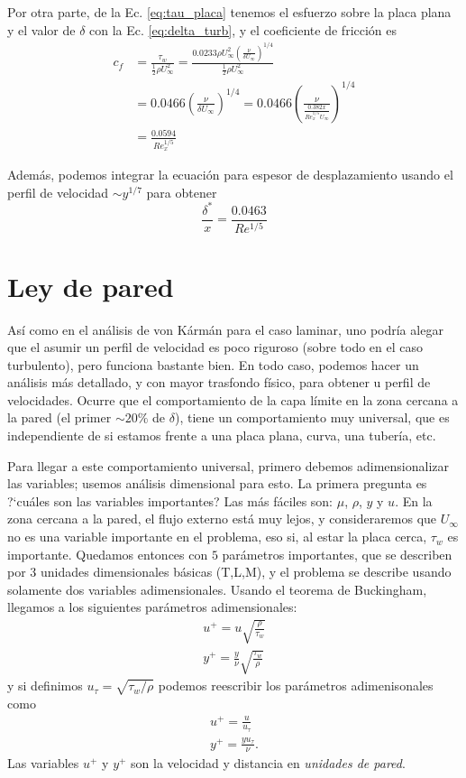 Por otra parte, de la Ec. \eqref{eq:tau_placa} tenemos el esfuerzo sobre la placa plana y el valor de $\delta$ con la Ec. \eqref{eq:delta_turb}, y el coeficiente de fricción es
%
\begin{align}
c_f &= \frac{\tau_w}{\frac{1}{2}\rho U_\infty^2} = \frac{0.0233\rho U_\infty^2\left(\frac{\nu}{\delta U_\infty}\right)^{1/4}}{\frac{1}{2}\rho U_\infty^2 }\nonumber\\
    &= 0.0466\left(\frac{\nu}{\delta U_\infty}\right)^{1/4} = 0.0466\left(\frac{\nu}{\frac{0.382x}{Re_x^{1/5} U_\infty}}\right)^{1/4} \nonumber\\
    &= \frac{0.0594}{Re_x^{1/5}}
\end{align}

Además, podemos integrar la ecuación para espesor de desplazamiento usando el perfil de velocidad $\sim y^{1/7}$ para obtener
%
\begin{equation}
\frac{\delta^*}{x}=\frac{0.0463}{Re^{1/5}} 
\end{equation}

\section*{Ley de pared}

Así como en el análisis de von Kármán para el caso laminar, uno podría alegar que el asumir un perfil de velocidad es poco riguroso (sobre todo en el caso turbulento), pero funciona bastante bien.
En todo caso, podemos hacer un análisis más detallado, y con mayor trasfondo físico, para obtener u perfil de velocidades.
Ocurre que el comportamiento de la capa límite en la zona cercana a la pared (el primer $\sim20\%$ de $\delta$), tiene un comportamiento muy universal, que es independiente de si estamos frente a una placa plana, curva, una tubería, etc.

Para llegar a este comportamiento universal, primero debemos adimensionalizar las variables; usemos análisis dimensional para esto.
La primera pregunta es \mbox{?`}cuáles son las variables importantes? Las más fáciles son: $\mu$, $\rho$, $y$ y $u$.
En la zona cercana a la pared, el flujo externo está muy lejos, y consideraremos que $U_\infty$ no es una variable importante en el problema, eso si, al estar la placa cerca, $\tau_w$ es importante.
Quedamos entonces con $5$ parámetros importantes, que se describen por $3$ unidades dimensionales básicas (T,L,M), y el problema se describe usando solamente dos variables adimensionales.
Usando el teorema de Buckingham, llegamos a los siguientes parámetros adimensionales:
%
\begin{align}
u^+ = u\sqrt{\frac{\rho}{\tau_w}}\nonumber\\
y^+ = \frac{y}{\nu}\sqrt{\frac{\tau_w}{\rho}}
\end{align}
%
y si definimos $u_\tau=\sqrt{\tau_w/\rho}$ podemos reescribir los parámetros adimenisonales como
%
\begin{align}\label{eq:unidades_pared}
u^+=\frac{u}{u_\tau}\nonumber\\
y^+=\frac{yu_\tau}{\nu}.
\end{align}
%
Las variables $u^+$ y $y^+$ son la velocidad y distancia en \emph{unidades de pared}.

